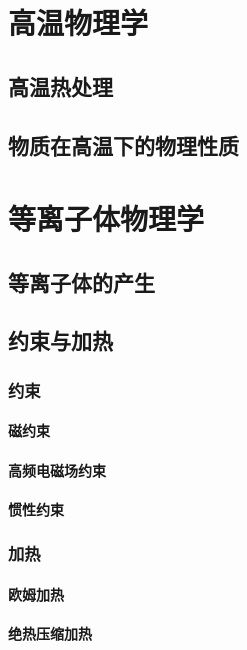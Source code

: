 \documentclass[UTF8]{../06-Physics}
\begin{document}
\chapter{高温物理学}
\section{高温热处理}
\section{物质在高温下的物理性质}






\chapter{等离子体物理学}
\section{等离子体的产生}
\section{约束与加热}
    \subsection{约束}
        \subsubsection{磁约束}
        \subsubsection{高频电磁场约束}
        \subsubsection{惯性约束}
        
    \subsection{加热}
    \subsubsection{欧姆加热}
    \subsubsection{绝热压缩加热}
\end{document}
